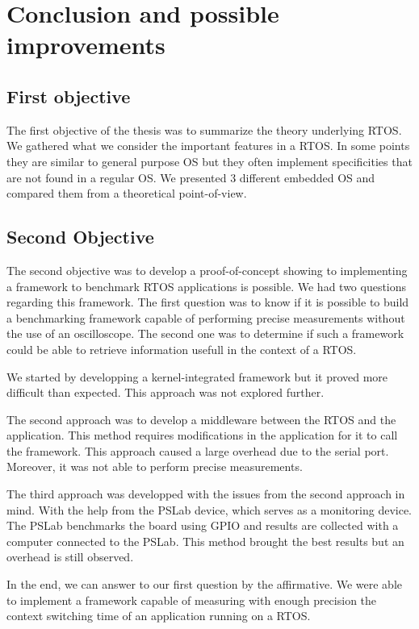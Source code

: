 \chapter*{Conclusion and possible improvements}

\section*{First objective}
The first objective of the thesis was to summarize the theory underlying RTOS.
We gathered what we consider the important features in a RTOS.
In some points they are similar to general purpose OS but they often implement specificities that are not found in a regular OS.
We presented 3 different embedded OS and compared them from a theoretical point-of-view.

\section*{Second Objective}
The second objective was to develop a proof-of-concept showing to implementing a framework to benchmark RTOS applications is possible.
We had two questions regarding this framework.
The first question was to know if it is possible to build a benchmarking framework capable of performing precise measurements without the use of an oscilloscope.
The second one was to determine if such a framework could be able to retrieve information usefull in the context of a RTOS.

We started by developping a kernel-integrated framework but it proved more difficult than expected.
This approach was not explored further.

The second approach was to develop a middleware between the RTOS and the application.
This method requires modifications in the application for it to call the framework.
This approach caused a large overhead due to the serial port.
Moreover, it was not able to perform precise measurements.

The third approach was developped with the issues from the second approach in mind.
With the help from the PSLab device, which serves as a monitoring device.
The PSLab benchmarks the board using GPIO and results are collected with a computer connected to the PSLab.
This method brought the best results but an overhead is still observed.

In the end, we can answer to our first question by the affirmative.
We were able to implement a framework capable of measuring with enough precision the context switching time of an application running on a RTOS.

